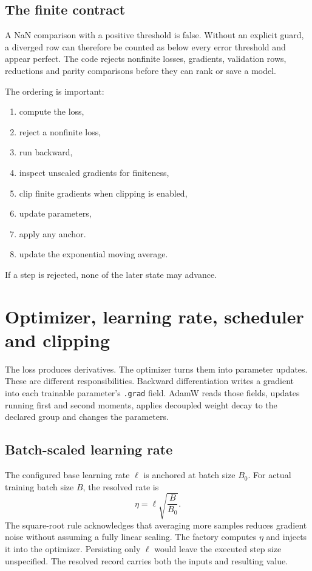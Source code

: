 \documentclass[10pt,aps,prd,twocolumn,nofootinbib]{revtex4-2}
\newcommand{\code}[1]{\texttt{#1}}
\begin{document}
\subsection{The finite contract}

A NaN comparison with a positive threshold is false.  Without an explicit
guard, a diverged row can therefore be counted as below every error threshold
and appear perfect.  The code rejects nonfinite losses, gradients, validation
rows, reductions and parity comparisons before they can rank or save a
model.

The ordering is important:
\begin{enumerate}
  \item compute the loss,
  \item reject a nonfinite loss,
  \item run backward,
  \item inspect unscaled gradients for finiteness,
  \item clip finite gradients when clipping is enabled,
  \item update parameters,
  \item apply any anchor.
  \item update the exponential moving average.
\end{enumerate}
If a step is rejected, none of the later state may advance.

\section{Optimizer, learning rate, scheduler and clipping}
\label{sec:optimization}

The loss produces derivatives.  The optimizer turns them into parameter
updates.  These are different responsibilities.  Backward differentiation
writes a gradient into each trainable parameter's \code{.grad} field.
AdamW reads those fields, updates running first and second moments, applies
decoupled weight decay to the declared group and changes the parameters.

\subsection{Batch-scaled learning rate}

The configured base learning rate \(\ell\) is anchored at batch size \(B_0\).
For actual training batch size \(B\), the resolved rate is
\begin{equation}
  \eta=\ell\sqrt{\frac{B}{B_0}}.
  \label{eq:batch-lr}
\end{equation}
The square-root rule acknowledges that averaging more samples reduces
gradient noise without assuming a fully linear scaling.  The factory computes
\(\eta\) and injects it into the optimizer.  Persisting only \(\ell\) would
leave the executed step size unspecified.  The resolved record carries both
the inputs and resulting value.
\end{document}
